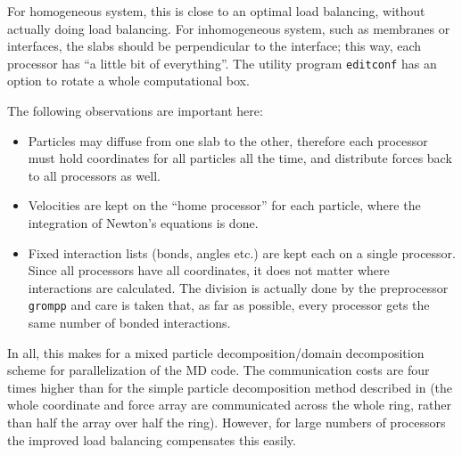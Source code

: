 {For homogeneous system, this is close to an optimal load balancing,
without actually doing load balancing. For inhomogeneous system, such
as membranes or interfaces, the slabs should be perpendicular to the
interface; this way, each processor has ``a little bit of
everything''.  The {\gromacs} utility program {\tt editconf} has an
option to rotate a whole computational box.

The following observations are important here:
\begin{itemize}
\item   Particles may diffuse from one slab to the other, therefore each processor
        must hold coordinates for all particles all the time, and distribute forces
        back to all processors as well.
\item   Velocities are kept on the ``home processor'' for each particle,
        where the integration of Newton's equations is done.
\item   Fixed interaction lists (bonds, angles etc.) are kept each
        on a single processor.  Since all processors have all
        coordinates, it does not matter where interactions are
        calculated.  The division is actually done by the {\gromacs}
        preprocessor {\tt grompp} and care is taken that, as far as
        possible, every processor gets the same number of bonded
        interactions.
\end{itemize}

In all, this makes for a mixed particle decomposition/domain decomposition scheme
for parallelization of the MD code. The communication costs are four times higher
than for the simple particle decomposition method described in 
(the whole coordinate and force array are communicated across the whole ring,
rather than half the array over half the ring).
However, for large numbers of processors the improved load balancing 
compensates this easily.

}
